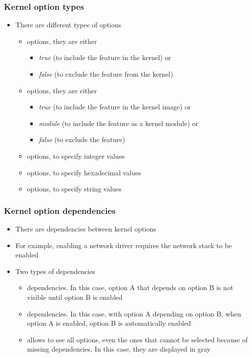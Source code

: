 \begin{frame}
  \frametitle{Kernel option types}
  \begin{itemize}
  \item There are different types of options
    \begin{itemize}
    \item {} options, they are either
      \begin{itemize}
      \item {\em true} (to include the feature in the kernel) or
      \item {\em false} (to exclude the feature from the kernel)
      \end{itemize}
    \item {} options, they are either
      \begin{itemize}
      \item {\em true} (to include the feature in the kernel image) or
      \item {\em module} (to include the feature as a kernel module) or
      \item {\em false} (to exclude the feature)
      \end{itemize}
    \item {} options, to specify integer values
    \item {} options, to specify hexadecimal values
    \item {} options, to specify string values
    \end{itemize}
  \end{itemize}
\end{frame}

\begin{frame}
  \frametitle{Kernel option dependencies}
  \begin{itemize}
  \item There are dependencies between kernel options
  \item For example, enabling a network driver requires the network
    stack to be enabled
  \item Two types of dependencies
    \begin{itemize}
    \item {} dependencies. In this case, option A that
      depends on option B is not visible until option B is enabled
    \item {} dependencies. In this case, with option A
      depending on option B, when option A is enabled, option B is
      automatically enabled
    \item {} allows to see all options, even the ones
      that cannot be selected because of missing dependencies. In this
      case, they are displayed in gray
    \end{itemize}
  \end{itemize}
\end{frame}

